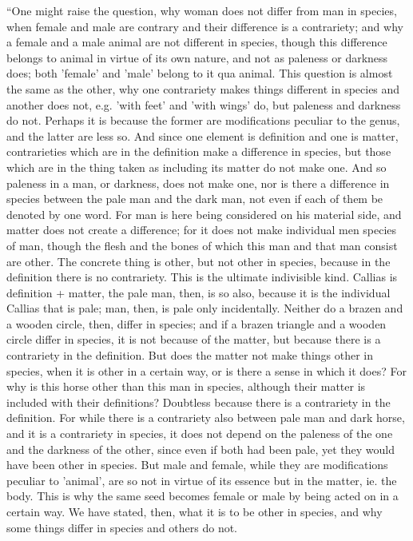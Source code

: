 ``One might raise the question, why woman does not differ from man in species, when female and male are contrary and their difference is a contrariety; and why a female and a male animal are not different in species, though this difference belongs to animal in virtue of its own nature, and not as paleness or darkness does; both 'female' and 'male' belong to it qua animal. This question is almost the same as the other, why one contrariety makes things different in species and another does not, e.g. 'with feet' and 'with wings' do, but paleness and darkness do not. Perhaps it is because the former are modifications peculiar to the genus, and the latter are less so. And since one element is definition and one is matter, contrarieties which are in the definition make a difference in species, but those which are in the thing taken as including its matter do not make one. And so paleness in a man, or darkness, does not make one, nor is there a difference in species between the pale man and the dark man, not even if each of them be denoted by one word. For man is here being considered on his material side, and matter does not create a difference; for it does not make individual men species of man, though the flesh and the bones of which this man and that man consist are other. The concrete thing is other, but not other in species, because in the definition there is no contrariety. This is the ultimate indivisible kind. Callias is definition + matter, the pale man, then, is so also, because it is the individual Callias that is pale; man, then, is pale only incidentally. Neither do a brazen and a wooden circle, then, differ in species; and if a brazen triangle and a wooden circle differ in species, it is not because of the matter, but because there is a contrariety in the definition. But does the matter not make things other in species, when it is other in a certain way, or is there a sense in which it does? For why is this horse other than this man in species, although their matter is included with their definitions? Doubtless because there is a contrariety in the definition. For while there is a contrariety also between pale man and dark horse, and it is a contrariety in species, it does not depend on the paleness of the one and the darkness of the other, since even if both had been pale, yet they would have been other in species. But male and female, while they are modifications peculiar to 'animal', are so not in virtue of its essence but in the matter, ie. the body. This is why the same seed becomes female or male by being acted on in a certain way. We have stated, then, what it is to be other in species, and why some things differ in species and others do not.

